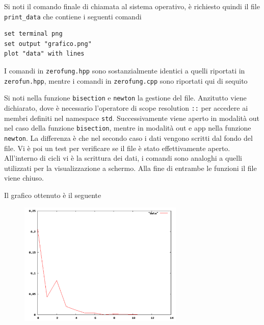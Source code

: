 Si noti il comando finale di chiamata al sistema operativo,
\`e richiesto quindi il file \texttt{print\_data} che contiene i seguenti comandi
\begin{verbatim}
set terminal png
set output "grafico.png"
plot "data" with lines
\end{verbatim}
I comandi in \texttt{zerofung.hpp} sono sostanzialmente identici a quelli
riportati in \texttt{zerofun.hpp}, mentre i comandi in \texttt{zerofung.cpp}
sono riportati qui di sequito
\lstset{basicstyle=\scriptsize\sf}
    
\lstset{basicstyle=\sf}

Si noti nella funzione \texttt{bisection} e \texttt{newton} la gestione del file.
Anzitutto viene dichiarato, dove \`e necessario l'operatore di scope resolution
\texttt{::} per accedere ai membri definiti nel namespace \texttt{std}.
Successivamente viene aperto in modalit\`a out nel caso della funzione
\texttt{bisection}, mentre in modalit\`a out e app nella funzione \texttt{newton}.
La differenza \`e che nel secondo caso i dati vengono scritti dal fondo del file.
Vi \`e poi un test per verificare se il file \`e stato effettivamente aperto.
All'interno di cicli vi \`e la scrittura dei dati, i comandi sono analoghi a
quelli utilizzati per la visualizzazione a schermo.
Alla fine di entrambe le funzioni il file viene chiuso.

Il grafico ottenuto \`e il seguente
\begin{figure}[!h]
    \centering
    \includegraphics[width=0.7\textwidth]{./images/grafico}
\end{figure}
